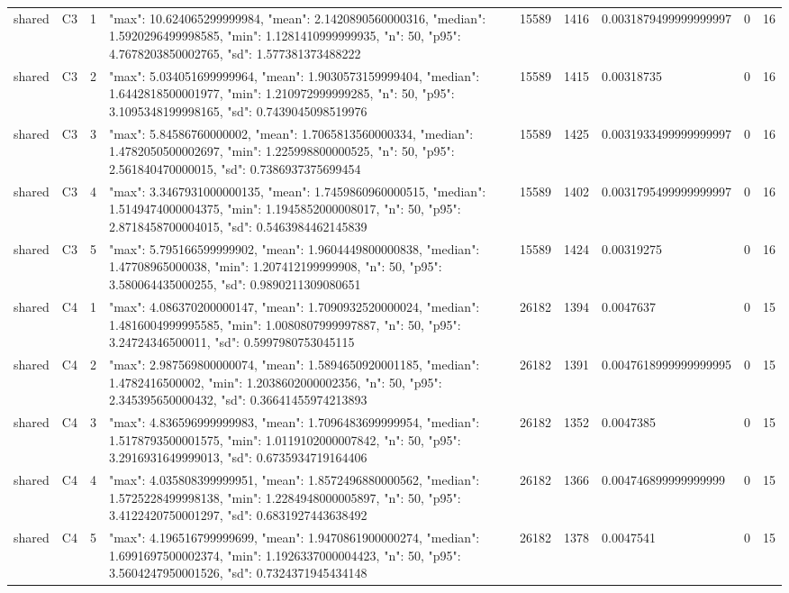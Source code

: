 \begin{tabular}{lllllllll}
shared & C3 & 1 & {"max": 10.624065299999984, "mean": 2.1420890560000316, "median": 1.5920296499998585, "min": 1.1281410999999935, "n": 50, "p95": 4.7678203850002765, "sd": 1.577381373488222} & 15589 & 1416 & 0.0031879499999999997 & 0 & 16 \\
shared & C3 & 2 & {"max": 5.034051699999964, "mean": 1.9030573159999404, "median": 1.6442818500001977, "min": 1.210972999999285, "n": 50, "p95": 3.1095348199998165, "sd": 0.7439045098519976} & 15589 & 1415 & 0.00318735 & 0 & 16 \\
shared & C3 & 3 & {"max": 5.84586760000002, "mean": 1.7065813560000334, "median": 1.4782050500002697, "min": 1.225998800000525, "n": 50, "p95": 2.561840470000015, "sd": 0.7386937375699454} & 15589 & 1425 & 0.0031933499999999997 & 0 & 16 \\
shared & C3 & 4 & {"max": 3.3467931000000135, "mean": 1.7459860960000515, "median": 1.5149474000004375, "min": 1.1945852000008017, "n": 50, "p95": 2.8718458700004015, "sd": 0.5463984462145839} & 15589 & 1402 & 0.0031795499999999997 & 0 & 16 \\
shared & C3 & 5 & {"max": 5.795166599999902, "mean": 1.9604449800000838, "median": 1.47708965000038, "min": 1.207412199999908, "n": 50, "p95": 3.580064435000255, "sd": 0.9890211309080651} & 15589 & 1424 & 0.00319275 & 0 & 16 \\
shared & C4 & 1 & {"max": 4.086370200000147, "mean": 1.7090932520000024, "median": 1.4816004999995585, "min": 1.0080807999997887, "n": 50, "p95": 3.24724346500011, "sd": 0.5997980753045115} & 26182 & 1394 & 0.0047637 & 0 & 15 \\
shared & C4 & 2 & {"max": 2.987569800000074, "mean": 1.5894650920001185, "median": 1.4782416500002, "min": 1.2038602000002356, "n": 50, "p95": 2.345395650000432, "sd": 0.36641455974213893} & 26182 & 1391 & 0.0047618999999999995 & 0 & 15 \\
shared & C4 & 3 & {"max": 4.836596999999983, "mean": 1.7096483699999954, "median": 1.5178793500001575, "min": 1.0119102000007842, "n": 50, "p95": 3.2916931649999013, "sd": 0.6735934719164406} & 26182 & 1352 & 0.0047385 & 0 & 15 \\
shared & C4 & 4 & {"max": 4.035808399999951, "mean": 1.8572496880000562, "median": 1.5725228499998138, "min": 1.2284948000005897, "n": 50, "p95": 3.4122420750001297, "sd": 0.6831927443638492} & 26182 & 1366 & 0.004746899999999999 & 0 & 15 \\
shared & C4 & 5 & {"max": 4.196516799999699, "mean": 1.9470861900000274, "median": 1.6991697500002374, "min": 1.1926337000004423, "n": 50, "p95": 3.5604247950001526, "sd": 0.7324371945434148} & 26182 & 1378 & 0.0047541 & 0 & 15 \\

\end{tabular}
